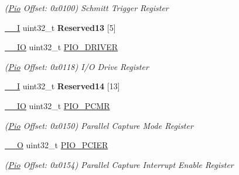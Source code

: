 \begin{DoxyCompactItemize}
\begin{DoxyCompactList}\small\item\em (\mbox{\hyperlink{structPio}{Pio}} Offset\+: 0x0100) Schmitt Trigger Register \end{DoxyCompactList}\item 
\mbox{\label{structPio_a767c24c23959fed16242c1e8226c6268}} 
\mbox{\hyperlink{core__cm7_8h_af63697ed9952cc71e1225efe205f6cd3}{\+\_\+\+\_\+I}} uint32\+\_\+t {\bfseries Reserved13} \mbox{[}5\mbox{]}
\item 
\mbox{\label{structPio_a5b2e1e144fd6611eee13fdb76d6f83c1}} 
\mbox{\hyperlink{core__cm7_8h_aec43007d9998a0a0e01faede4133d6be}{\+\_\+\+\_\+\+IO}} uint32\+\_\+t \mbox{\hyperlink{structPio_a5b2e1e144fd6611eee13fdb76d6f83c1}{P\+I\+O\+\_\+\+D\+R\+I\+V\+ER}}
\begin{DoxyCompactList}\small\item\em (\mbox{\hyperlink{structPio}{Pio}} Offset\+: 0x0118) I/O Drive Register \end{DoxyCompactList}\item 
\mbox{\label{structPio_ae5e828cc4c804e2fb977561545f97f5b}} 
\mbox{\hyperlink{core__cm7_8h_af63697ed9952cc71e1225efe205f6cd3}{\+\_\+\+\_\+I}} uint32\+\_\+t {\bfseries Reserved14} \mbox{[}13\mbox{]}
\item 
\mbox{\label{structPio_a4d123acf513b7a6c63b845f7e358e256}} 
\mbox{\hyperlink{core__cm7_8h_aec43007d9998a0a0e01faede4133d6be}{\+\_\+\+\_\+\+IO}} uint32\+\_\+t \mbox{\hyperlink{structPio_a4d123acf513b7a6c63b845f7e358e256}{P\+I\+O\+\_\+\+P\+C\+MR}}
\begin{DoxyCompactList}\small\item\em (\mbox{\hyperlink{structPio}{Pio}} Offset\+: 0x0150) Parallel Capture Mode Register \end{DoxyCompactList}\item 
\mbox{\label{structPio_af0f887b8f93aae59d64c010bd81cc71f}} 
\mbox{\hyperlink{core__cm7_8h_a7e25d9380f9ef903923964322e71f2f6}{\+\_\+\+\_\+O}} uint32\+\_\+t \mbox{\hyperlink{structPio_af0f887b8f93aae59d64c010bd81cc71f}{P\+I\+O\+\_\+\+P\+C\+I\+ER}}
\begin{DoxyCompactList}\small\item\em (\mbox{\hyperlink{structPio}{Pio}} Offset\+: 0x0154) Parallel Capture Interrupt Enable Register \end{DoxyCompactList}\item 

\end{DoxyCompactItemize}
